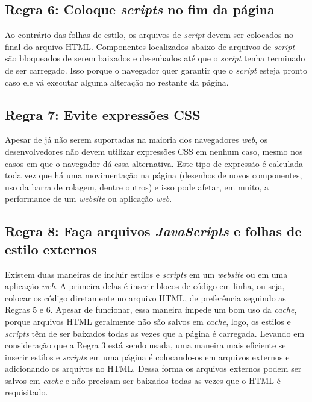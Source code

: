 \subsection{Regra 6: Coloque \textit{scripts} no fim da página}
\label{subsec:highperformance_regra6}
Ao contrário das folhas de estilo, os arquivos de \textit{script} devem ser colocados no final do arquivo HTML. Componentes localizados abaixo de arquivos de \textit{script} são bloqueados de serem baixados e desenhados até que o \textit{script} tenha terminado de ser carregado. Isso porque o navegador quer garantir que o \textit{script} esteja pronto caso ele vá executar alguma alteração no restante da página.

\subsection{Regra 7: Evite expressões CSS}
\label{subsec:highperformance_regra7}
Apesar de já não serem suportadas na maioria dos navegadores \textit{web}, os desenvolvedores não devem utilizar expressões CSS em nenhum caso, mesmo nos casos em que o navegador dá essa alternativa. Este tipo de expressão é calculada toda vez que há uma movimentação na página (desenhos de novos componentes, uso da barra de rolagem, dentre outros) e isso pode afetar, em muito, a performance de um \textit{website} ou aplicação \textit{web}.

\subsection{Regra 8: Faça arquivos \textit{JavaScripts} e folhas de estilo externos}
\label{subsec:highperformance_regra8}
Existem duas maneiras de incluir estilos e \textit{scripts} em um \textit{website} ou em uma aplicação \textit{web}. A primeira delas é inserir blocos de código em linha, ou seja, colocar os código diretamente no arquivo HTML, de preferência seguindo as Regras 5 e 6. Apesar de funcionar, essa maneira impede um bom uso da \textit{cache}, porque arquivos HTML geralmente não são salvos em \textit{cache}, logo, os estilos e \textit{scripts} têm de ser baixados todas as vezes que a página é carregada. Levando em consideração que a Regra 3 está sendo usada, uma maneira mais eficiente se inserir estilos e \textit{scripts} em uma página é colocando-os em arquivos externos e adicionando os arquivos no HTML. Dessa forma os arquivos externos podem ser salvos em \textit{cache} e não precisam ser baixados todas as vezes que o HTML é requisitado.

